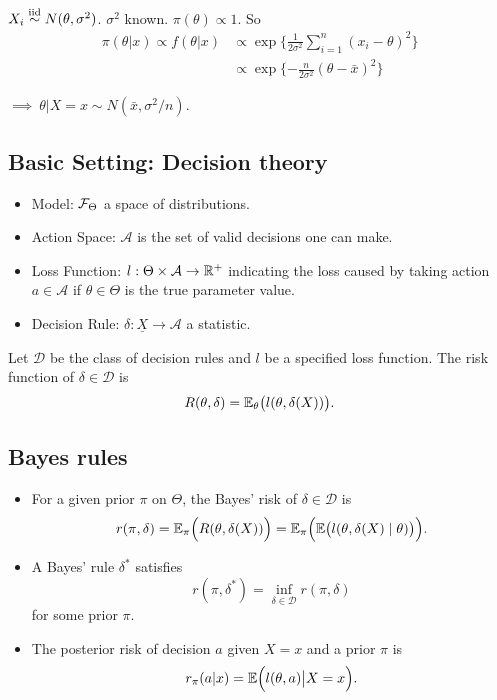 \begin{exap}
	$X_i \stackrel{\text{iid}}{\sim} N(\theta, \sigma^2)$. $\sigma^2$ known. $\pi(\theta)\propto 1$. So 
	\begin{align*}
		\pi(\theta|x) \propto f(\theta|x) & \propto \exp\{ \frac{1}{2\sigma^2} \sum_{i=1}^n(x_i - \theta)^2 \}\\
		&\propto \exp\{ -\frac{n}{2\sigma^2}(\theta - \bar{x})^2 \}
	\end{align*}
	
	$\implies \ \theta|X=x \sim N(\bar{x}, \sigma^2/n)$.
\end{exap}

\subsection{Basic Setting: Decision theory}
\begin{mydef}\textbf{ }
	\begin{itemize}
		\item Model: $\mathcal{F}_\Theta$ a space of distributions.
		\item Action Space: $\mathcal{A}$ is the set of valid decisions one can make.
		\item Loss Function: $l:\Theta\times \mathcal{A} \to \mathbb{R}^+$ indicating the loss caused by taking action $a\in\mathcal{A}$ if $\theta\in \Theta$ is the true parameter value.
		\item Decision Rule: $\delta: \underline{X}\to \mathcal{A}$ a statistic.
	\end{itemize}
\end{mydef}

\begin{mydef}
	Let $\mathcal{D}$ be the class of decision rules and $l$ be a specified loss function. The risk function of $\delta\in \mathcal{D}$ is 
	$$R(\theta, \delta) = \mathbb{E}_\theta \big( l(\theta, \delta(X)) \big).$$ 
\end{mydef}
  
\subsection{Bayes rules}
\begin{mydef}\textbf{ }
	\begin{itemize}
		\item 
		For a given prior $\pi$ on $\Theta$, the Bayes' risk of $\delta \in \mathcal{D}$ is 
		$$r(\pi, \delta) = \mathbb{E}_\pi \Big( R(\theta, \delta(X)) \Big) =  \mathbb{E}_\pi \Big( \mathbb{E} \big( l(\theta, \delta(X)\mid \theta) \big) \Big).$$
		
		\item 
		A Bayes' rule $\delta^\ast$ satisfies
		$$r(\pi, \delta^\ast) = \inf_{\delta\in \mathcal{D}} r(\pi, \delta)$$
		for some prior $\pi$.
		
		\item 
		The posterior risk of decision $a$ given $X=x$ and a prior $\pi$ is  
		$$r_\pi(a|x) = \mathbb{E} \Big(  l(\theta,a) \big| X=x \Big).$$
	\end{itemize}
\end{mydef}
 
 